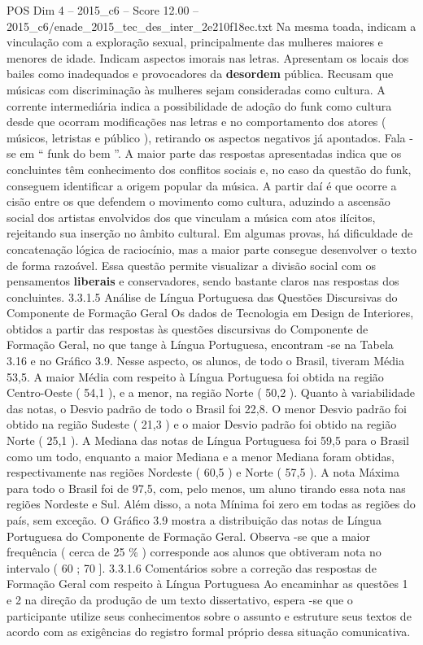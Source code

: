 \begin{textsample}{POS Dim 4 – 2015\_c6 – Score 12.00 – 2015\_c6/enade\_2015\_tec\_des\_inter\_2e210f18ec.txt}
Na mesma toada, indicam a vinculação com a exploração sexual, principalmente das mulheres maiores e menores de idade.
Indicam aspectos imorais nas letras.
Apresentam os locais dos bailes como inadequados e provocadores da \textbf{desordem} pública.
Recusam que músicas com discriminação às mulheres sejam consideradas como cultura.
A corrente intermediária indica a possibilidade de adoção do funk como cultura desde que ocorram modificações nas letras e no comportamento dos atores ( músicos, letristas e público ), retirando os aspectos negativos já apontados.
Fala -se em “ funk do bem ”.
A maior parte das respostas apresentadas indica que os concluintes têm conhecimento dos conflitos sociais e, no caso da questão do funk, conseguem identificar a origem popular da música.
A partir daí é que ocorre a cisão entre os que defendem o movimento como cultura, aduzindo a ascensão social dos artistas envolvidos dos que vinculam a música com atos ilícitos, rejeitando sua inserção no âmbito cultural.
Em algumas provas, há dificuldade de concatenação lógica de raciocínio, mas a maior parte consegue desenvolver o texto de forma razoável.
Essa questão permite visualizar a divisão social com os pensamentos \textbf{liberais} e conservadores, sendo bastante claros nas respostas dos concluintes. 3.3.1.5 Análise de Língua Portuguesa das Questões Discursivas do Componente de Formação Geral Os dados de Tecnologia em Design de Interiores, obtidos a partir das respostas às questões discursivas do Componente de Formação Geral, no que tange à Língua Portuguesa, encontram -se na Tabela 3.16 e no Gráfico 3.9.
Nesse aspecto, os alunos, de todo o Brasil, tiveram Média 53,5.
A maior Média com respeito à Língua Portuguesa foi obtida na região Centro-Oeste ( 54,1 ), e a menor, na região Norte ( 50,2 ).
Quanto à variabilidade das notas, o Desvio padrão de todo o Brasil foi 22,8.
O menor Desvio padrão foi obtido na região Sudeste ( 21,3 ) e o maior Desvio padrão foi obtido na região Norte ( 25,1 ).
A Mediana das notas de Língua Portuguesa foi 59,5 para o Brasil como um todo, enquanto a maior Mediana e a menor Mediana foram obtidas, respectivamente nas regiões Nordeste ( 60,5 ) e Norte ( 57,5 ).
A nota Máxima para todo o Brasil foi de 97,5, com, pelo menos, um aluno tirando essa nota nas regiões Nordeste e Sul.
Além disso, a nota Mínima foi zero em todas as regiões do país, sem exceção.
O Gráfico 3.9 mostra a distribuição das notas de Língua Portuguesa do Componente de Formação Geral.
Observa -se que a maior frequência ( cerca de 25 \% ) corresponde aos alunos que obtiveram nota no intervalo ( 60 ; 70 ]. 3.3.1.6 Comentários sobre a correção das respostas de Formação Geral com respeito à Língua Portuguesa Ao encaminhar as questões 1 e 2 na direção da produção de um texto dissertativo, espera -se que o participante utilize seus conhecimentos sobre o assunto e estruture seus textos de acordo com as exigências do registro formal próprio dessa situação comunicativa.

\end{textsample}
